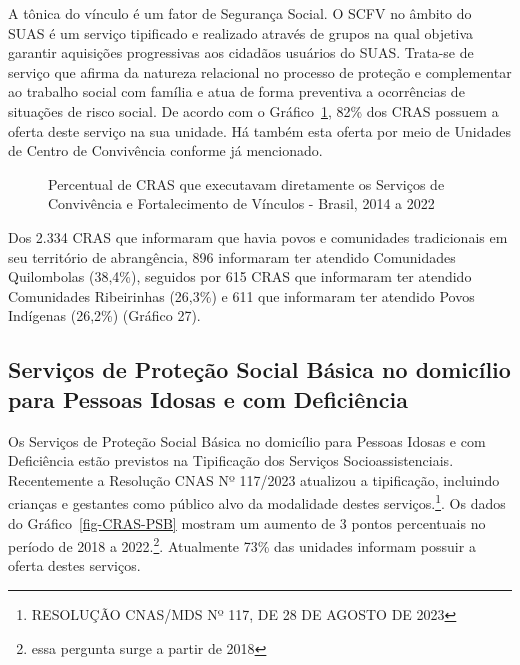 \documentclass[
  letterpaper,
  DIV=11,
  numbers=noendperiod]{scrreprt}
\begin{document}
A tônica do vínculo é um fator de Segurança Social. O SCFV no âmbito do
SUAS é um serviço tipificado e realizado através de grupos na qual
objetiva garantir aquisições progressivas aos cidadãos usuários do SUAS.
Trata-se de serviço que afirma da natureza relacional no processo de
proteção e complementar ao trabalho social com família e atua de forma
preventiva a ocorrências de situações de risco social. De acordo com o
Gráfico~\ref{fig-CRAS-SCFV}, 82\% dos CRAS possuem a oferta deste
serviço na sua unidade. Há também esta oferta por meio de Unidades de
Centro de Convivência conforme já mencionado.

\begin{figure}


\caption{\label{fig-CRAS-SCFV}Percentual de CRAS que executavam
diretamente os Serviços de Convivência e Fortalecimento de Vínculos -
Brasil, 2014 a 2022}

\end{figure}%

Dos 2.334 CRAS que informaram que havia povos e comunidades tradicionais
em seu território de abrangência, 896 informaram ter atendido
Comunidades Quilombolas (38,4\%), seguidos por 615 CRAS que informaram
ter atendido Comunidades Ribeirinhas (26,3\%) e 611 que informaram ter
atendido Povos Indígenas (26,2\%) (Gráfico 27).

\subsection{Serviços de Proteção Social Básica no domicílio para Pessoas
Idosas e com
Deficiência}\label{serviuxe7os-de-proteuxe7uxe3o-social-buxe1sica-no-domicuxedlio-para-pessoas-idosas-e-com-deficiuxeancia}

Os Serviços de Proteção Social Básica no domicílio para Pessoas Idosas e
com Deficiência estão previstos na Tipificação dos Serviços
Socioassistenciais. Recentemente a Resolução CNAS Nº 117/2023 atualizou
a tipificação, incluindo crianças e gestantes como público alvo da
modalidade destes serviços.\footnote{RESOLUÇÃO CNAS/MDS Nº 117, DE 28 DE
  AGOSTO DE 2023}. Os dados do Gráfico~\ref{fig-CRAS-PSB} mostram um
aumento de 3 pontos percentuais no período de 2018 a 2022.\footnote{essa
  pergunta surge a partir de 2018}. Atualmente 73\% das unidades
informam possuir a oferta destes serviços.
\end{document}
